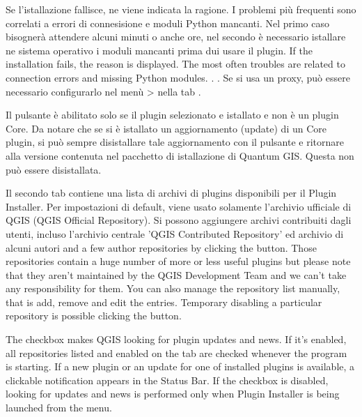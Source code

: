Se l'istallazione fallisce, ne viene indicata la ragione. I problemi più frequenti sono correlati a errori di connesisione e moduli Python mancanti. Nel primo caso bisognerà attendere alcuni minuti o anche ore, nel secondo è necessario istallare ne sistema operativo i moduli mancanti  prima dui usare il plugin. If the installation fails, the reason is displayed. The most often troubles are related to connection errors and missing Python modules. . . Se si usa un proxy, può essere necessario configurarlo nel menù  >  nella tab .

Il pulsante  è abilitato solo se il plugin selezionato e istallato e non è un plugin Core. Da notare che se si è istallato un aggiornamento (update) di un Core plugin, si può sempre disistallare tale aggiornamento con il pulsante  e ritornare alla versione contenuta nel pacchetto di istallazione di Quantum GIS. Questa non può essere disistallata.


Il secondo tab  contiene una lista di archivi di plugins disponibili per il Plugin Installer. Per impostazioni di default, viene usato solamente l'archivio ufficiale di QGIS (QGIS Official Repository). Si possono aggiungere archivi contribuiti dagli utenti, incluso l'archivio centrale 'QGIS Contributed Repository' ed archivio di alcuni autori and a few author repositories by clicking the  button. Those repositories contain a huge number of more or less useful plugins but please note that they aren't maintained by the QGIS Development Team and we can't take any responsibility for them. You can also manage the repository list manually, that is add, remove and edit the entries. Temporary disabling a particular repository is possible clicking the  button.

The  checkbox makes QGIS looking for plugin updates and news. If it's enabled, all repositories listed and enabled on the  tab are checked whenever the program is starting. If a new plugin or an update for one of installed plugins is available, a clickable notification appears in the Status Bar. If the checkbox is disabled, looking for updates and news is performed only when Plugin Installer is being launched from the menu.


